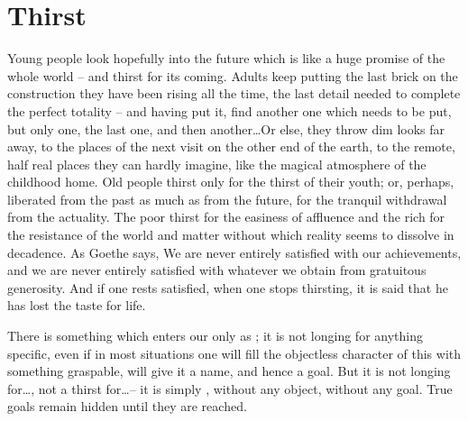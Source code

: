 \section{Thirst}%

\pa\label{pa:thirst} Young people look hopefully into the future which is like
a huge promise of the whole world -- and thirst for its coming. Adults keep
putting the last 
brick on the construction they have been rising all the time, the last detail
needed to complete the perfect totality -- and having put it, find another one
which needs to be put, but only one, the last one, and then another\ldots Or else,
they throw dim looks far away, to the places of the next visit on the other end
of the earth, to the remote, half real places they can hardly imagine, like the
magical atmosphere of the childhood home.  Old people thirst only for the thirst
of their youth; or, perhaps, liberated from the past as much as from the future,
for the tranquil withdrawal from the
actuality.  The poor thirst for the easiness of affluence and the rich for the
resistance of the world and matter without which reality seems to 
dissolve in decadence. As Goethe says,  We are never entirely satisfied with our achievements,
and we are never entirely satisfied with whatever we obtain from gratuitous
generosity. And if one rests satisfied, when one stops thirsting, it is said
that he has lost the taste for life.

 There is something which enters
our  only as ; it is not longing for anything
specific, even if in most situations one will fill the objectless character of
this  with something graspable, will give it a name, and hence a
goal. But it is not longing for\ldots, not a thirst for\ldots  -- it is simply
, without any object, without any goal. True goals remain hidden
until they are reached.

